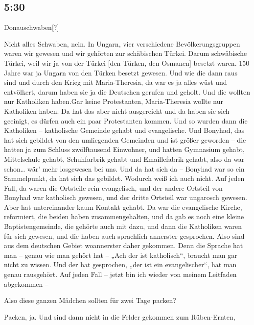 \documentclass[ngerman,]{article}
\providecommand{\tightlist}{%
  \setlength{\itemsep}{0pt}\setlength{\parskip}{0pt}}
\begin{document}
\begin{multicols}{3}
\hypertarget{section-4}{%
\subsection{5:30}\label{section-4}}

\begin{description}
\tightlist
\item[Ruth]
Donauschwaben{[}?{]}
\item[Käthe]
Nicht alles Schwaben, nein. In Ungarn, vier verschiedene
Bevölkerungsgruppen waren wir gewesen und wir gehörten zur schäbischen
Türkei. Darum schwäbische Türkei, weil wir ja von der Türkei {[}den
Türken, den Osmanen{]} besetzt waren. 150 Jahre war ja Ungarn von den
Türken besetzt gewesen. Und wie die dann raus sind und durch den Krieg
mit Maria-Theresia, da war es ja alles wüst und entvölkert, darum haben
sie ja die Deutschen gerufen und geholt. Und die wollten nur Katholiken
haben.Gar keine Protestanten, Maria-Theresia wollte nur Katholiken
haben. Da hat das aber nicht ausgereicht und da haben sie sich geeinigt,
es dürfen auch ein paar Protestanten kommen. Und so wurden dann die
Katholiken – katholische Gemeinde gehabt und evangelische. Und Bonyhad,
das hat sich gebildet von den umliegenden Gemeinden und ist größer
geworden – die hatten ja zum Schluss zwölftausend Einwohner, und hatten
Gymnasium gehabt, Mittelschule gehabt, Schuhfarbrik gehabt und
Emaillefabrik gehabt, also da war schon\ldots{} wär' mehr losgewesen bei
uns. Und da hat sich da – Bonyhad war so ein Sammelpunkt, da hat sich
das gebildet. Wodurch weiß ich auch nicht. Auf jeden Fall, da waren die
Ortsteile rein evangelisch, und der andere Ortsteil von Bonyhad war
katholisch gewesen, und der dritte Ortsteil war ungarosch gewesen. Aber
hat untereinander kaum Kontakt gehabt. Da war die evangelische Kirche,
reformiert, die beiden haben zusammengehalten, und da gab es noch eine
kleine Baptistengemeinde, die gehörte auch mit dazu, und dann die
Katholiken waren für sich gewesen, und die haben auch sprachlich
annerster gesprochen. Also sind aus dem deutschen Gebiet woannerster
daher gekommen. Denn die Sprache hat man – genau wie man gehört hat –
„Ach der ist katholisch“, braucht man gar nicht zu wissen. Und der hat
gesprochen, „der ist ein evangelischer“, hat man genau rausgehört. Auf
jeden Fall – jetzt bin ich wieder von meinem Leitfaden abgekommen –
\item[Ruth]
Also diese ganzen Mädchen sollten für zwei Tage packen?
\item[Käthe]
Packen, ja. Und sind dann nicht in die Felder gekommen zum Rüben-Ernten,

\end{description}
\end{multicols}
\end{document}
